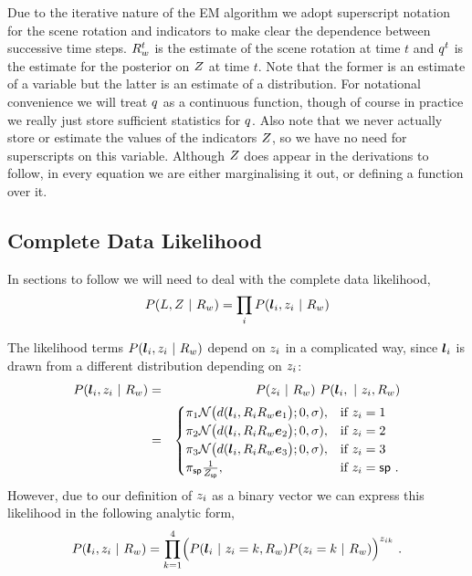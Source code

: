 Due to the iterative nature of the EM algorithm we adopt superscript
notation for the scene rotation and indicators to make clear the
dependence between successive time steps. $\SceneR^t$ is the estimate
of the scene rotation at time $t$ and $\PosteriorEst^t$ is the
estimate for the posterior on $\Indicators$ at time $t$. Note that the
former is an estimate of a variable but the latter is an estimate of a
distribution. For notational convenience we will treat $\PosteriorEst$
as a continuous function, though of course in practice we really just
store sufficient statistics for $\PosteriorEst$. Also note that we
never actually store or estimate the values of the indicators
$\Indicators$, so we have no need for superscripts on this
variable. Although $\Indicators$ does appear in the derivations to
follow, in every equation we are either marginalising it out, or
defining a function over it.

\subsection{Complete Data Likelihood}

In sections to follow we will need to deal with the complete data
likelihood,
\begin{equation}
  P(\LineSegs,\Indicators ~|~ \SceneR) =
  \prod_i P(\LineSeg_i,\Indicator_i ~|~ \SceneR)
\end{equation}

The likelihood terms $P(\LineSeg_i,\Indicator_i ~|~ \SceneR)$ depend
on $\Indicator_i$ in a complicated way, since $\LineSeg_i$ is
drawn from a different distribution depending on $\Indicator_i$:
\begin{eqnarray}
  P(\LineSeg_i,\Indicator_i ~|~ \SceneR) &=&
  P(\Indicator_i ~|~ \SceneR)~
  P(\LineSeg_i, ~|~ \Indicator_i, \SceneR)\\
  &=&
  \begin{cases}
    \Mixing_1 
    \NormalDistr\bigr(\dist(\LineSeg_i, \CamR_i\SceneR\ex\bigl); 0,\sigma),
    & \mbox{if } \Indicator_i = 1 \\
    \Mixing_2
    \NormalDistr\bigr(\dist(\LineSeg_i, \CamR_i\SceneR\ey\bigl); 0,\sigma),
    & \mbox{if } \Indicator_i = 2 \\
    \Mixing_3
    \NormalDistr\bigr(\dist(\LineSeg_i, \CamR_i\SceneR\ez\bigl); 0,\sigma),
    & \mbox{if } \Indicator_i = 3 \\
    \Mixing_{\Spurious}
    \frac{1}{Z_\Spurious},
    & \mbox{if } \Indicator_i = \Spurious ~.
  \end{cases}
\end{eqnarray}
However, due to our definition of $\Indicator_i$ as a binary vector we can
express this likelihood in the following analytic form,
\begin{equation}
  \label{eq:complete-likelihood}
  P(\LineSeg_i,\Indicator_i ~|~ \SceneR) =
  \prod_{k=1}^4 \Bigl( 
  P(\LineSeg_i ~|~ \Indicator_i=k,\SceneR)
  P(\Indicator_i=k ~|~ \SceneR)
  \Bigr)^{\Indicator_{ik}} ~.
\end{equation}

